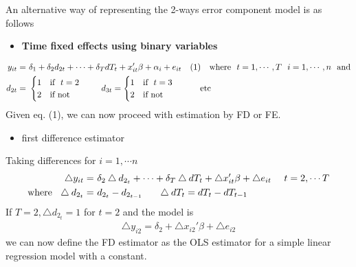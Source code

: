 \documentclass[a4paper,twoside,11pt]{article}
\begin{document}
\newline
\newline
\textcolor{NavyBlue}{An alternative way of representing the 2-ways error component model is as follows}
\begin{itemize}
    \item \textbf{Time fixed effects using binary variables}
\end{itemize}
\begin{equation*}
\begin{aligned}
y_{it} =& \  \delta_1 + \delta_2 d_{2t} + \cdots + \delta_T d T_t + x_{it}' \beta + \alpha_i + e_{it} \ \ \ (1) \ \ \  \textmd{where} \ \ t=1,\cdots, T \ \ i=1, \cdots , n \ \ \textmd{and} \\
d_{2t} =& \  \begin{cases}
1 \ \ \ \textmd{if} \ \ t=2 \\
2 \ \ \ \textmd{if not}
\end{cases} \ \ \ \ d_{3t} = \begin{cases}
1 \ \ \ \textmd{if} \ \ t=3 \\
2 \ \ \ \textmd{if not}
\end{cases} \ \ \ \ \ \ \textmd{etc}
\end{aligned}
\end{equation*}
Given eq. (1), we can now proceed with estimation by FD or FE.
\begin{itemize}
    \item first difference estimator
\end{itemize}
Taking differences for $i=1,\cdots n$
\begin{equation*}
\begin{aligned}
\bigtriangleup y_{it} =& \  \delta_2 \bigtriangleup d_{2_t} + \cdots + \delta_T \bigtriangleup d T_t + \bigtriangleup x_{it}' \beta + \bigtriangleup e_{it} \ \ \ \ t = 2,\cdots T\\
\textmd{where} \ \ \bigtriangleup d_{2_t} =& \  d_{2_t} - d_{2_{t-1}} \ \ \ \ \ \bigtriangleup d T_t = d T_t -  d T_{t-1}
\end{aligned}
\end{equation*}
If $T=2, \bigtriangleup d_{2_t} = 1$  for $t=2$ and the model is
\begin{equation*}
\begin{aligned}
\bigtriangleup y_{i2} = \delta_2 + \bigtriangleup x_{i2}' \beta + \bigtriangleup e_{i2}
\end{aligned}
\end{equation*}
we can now define the FD estimator as the OLS estimator for a simple linear regression model with a constant.
\end{document}

